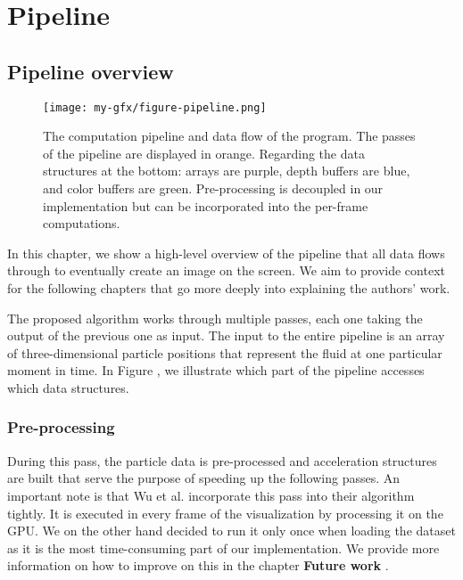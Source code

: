 %
\chapter{Pipeline}
\label{sec:pipeline}

\section{Pipeline overview}
\label{sec:pipelineoverview}

\begin{figure}[htb]
	\texttt{[image: my-gfx/figure-pipeline.png]}
	\caption{The computation pipeline and data flow of the program. The passes of the pipeline are displayed in orange. Regarding the data structures at the bottom: arrays are purple, depth buffers are blue, and color buffers are green. Pre-processing is decoupled in our implementation but can be incorporated into the per-frame computations.}
	\label{fig:pipelineoverview:pipeline}
\end{figure}

In this chapter, we show a high-level overview of the pipeline that all data flows through to eventually create an image on the screen. We aim to provide context for the following chapters that go more deeply into explaining the authors' work.

The proposed algorithm works through multiple passes, each one taking the output of the previous one as input. The input to the entire pipeline is an array of three-dimensional particle positions that represent the fluid at one particular moment in time. In Figure , we illustrate which part of the pipeline accesses which data structures.

\subsection{Pre-processing}

During this pass, the particle data is pre-processed and acceleration structures are built that serve the purpose of speeding up the following passes. An important note is that Wu et al. incorporate this pass into their algorithm tightly. It is executed in every frame of the visualization by processing it on the GPU. We on the other hand decided to run it only once when loading the dataset as it is the most time-consuming part of our implementation. We provide more information on how to improve on this in the chapter \textbf{Future work }.

